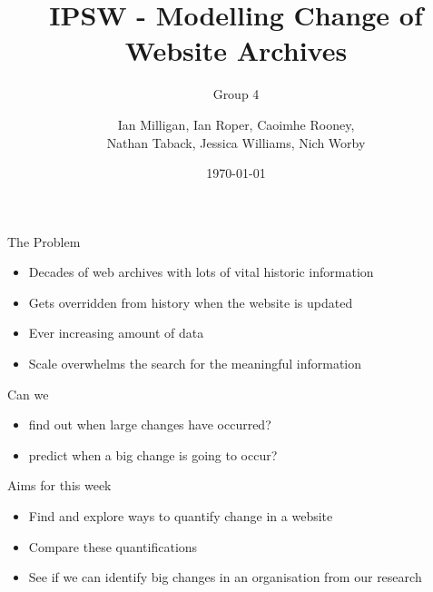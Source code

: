 \documentclass[10pt]{beamer}
\title{IPSW - Modelling Change of Website Archives}
\subtitle{Group 4}
\date{\today}
\author{Ian Milligan, Ian Roper, Caoimhe Rooney, \\Nathan Taback, Jessica Williams, Nich Worby}
\begin{document}
\maketitle



\begin{frame}{The Problem}

\large

\begin{itemize}
\item Decades of web archives with lots of vital historic information 
\item Gets overridden from history when the website is updated
\item Ever increasing amount of data
\item Scale overwhelms the search for the meaningful information
\end{itemize}

\pause

\vspace{5mm}

Can we
\begin{itemize}
\item find out when large changes have occurred?
\item predict when a big change is going to occur?
\end{itemize}

\end{frame}

\begin{frame}{Aims for this week}

\Large

\begin{itemize}
\itemsep1.0em
\item Find and explore ways to quantify change in a website
\item Compare these quantifications
\item See if we can identify big changes in an organisation from our research
\end{itemize}

\end{frame}
\end{document}
